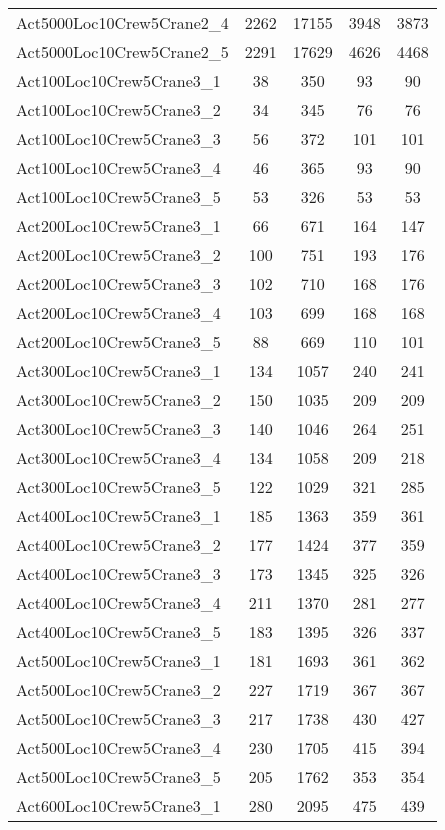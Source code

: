{\begin{center}
\begin{longtable}{ | l | c | c | c | c | }
Act5000Loc10Crew5Crane2\_4	&	2262	&	17155	&	3948	&	3873	\\
Act5000Loc10Crew5Crane2\_5	&	2291	&	17629	&	4626	&	4468	\\ \hline
Act100Loc10Crew5Crane3\_1	&	38	&	350	&	93	&	90	\\
Act100Loc10Crew5Crane3\_2	&	34	&	345	&	76	&	76	\\
Act100Loc10Crew5Crane3\_3	&	56	&	372	&	101	&	101	\\
Act100Loc10Crew5Crane3\_4	&	46	&	365	&	93	&	90	\\
Act100Loc10Crew5Crane3\_5	&	53	&	326	&	53	&	53	\\
Act200Loc10Crew5Crane3\_1	&	66	&	671	&	164	&	147	\\
Act200Loc10Crew5Crane3\_2	&	100	&	751	&	193	&	176	\\
Act200Loc10Crew5Crane3\_3	&	102	&	710	&	168	&	176	\\
Act200Loc10Crew5Crane3\_4	&	103	&	699	&	168	&	168	\\
Act200Loc10Crew5Crane3\_5	&	88	&	669	&	110	&	101	\\
Act300Loc10Crew5Crane3\_1	&	134	&	1057	&	240	&	241	\\
Act300Loc10Crew5Crane3\_2	&	150	&	1035	&	209	&	209	\\
Act300Loc10Crew5Crane3\_3	&	140	&	1046	&	264	&	251	\\
Act300Loc10Crew5Crane3\_4	&	134	&	1058	&	209	&	218	\\
Act300Loc10Crew5Crane3\_5	&	122	&	1029	&	321	&	285	\\
Act400Loc10Crew5Crane3\_1	&	185	&	1363	&	359	&	361	\\
Act400Loc10Crew5Crane3\_2	&	177	&	1424	&	377	&	359	\\
Act400Loc10Crew5Crane3\_3	&	173	&	1345	&	325	&	326	\\
Act400Loc10Crew5Crane3\_4	&	211	&	1370	&	281	&	277	\\
Act400Loc10Crew5Crane3\_5	&	183	&	1395	&	326	&	337	\\
Act500Loc10Crew5Crane3\_1	&	181	&	1693	&	361	&	362	\\
Act500Loc10Crew5Crane3\_2	&	227	&	1719	&	367	&	367	\\
Act500Loc10Crew5Crane3\_3	&	217	&	1738	&	430	&	427	\\
Act500Loc10Crew5Crane3\_4	&	230	&	1705	&	415	&	394	\\
Act500Loc10Crew5Crane3\_5	&	205	&	1762	&	353	&	354	\\
Act600Loc10Crew5Crane3\_1	&	280	&	2095	&	475	&	439	\\

\end{longtable}
\end{center}}
